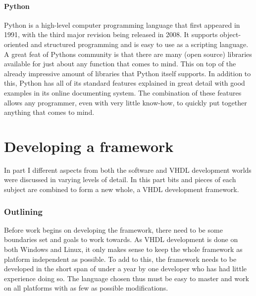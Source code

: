 \documentclass[11pt,british]{article}
\begin{document}
\subsection{Python}
Python is a high-level computer programming language that first appeared in 1991, with the third major revision being released in 2008. It supports object-oriented and structured programming and is easy to use as a scripting language. A great feat of Pythons community is that there are many (open source) libraries available for just about any function that comes to mind. This on top of the already impressive amount of libraries that Python itself supports. In addition to this, Python has all of its standard features explained in great detail with good examples in its online documenting system. The combination of these features allows any programmer, even with very little know-how, to quickly put together anything that comes to mind.


\newpage
\part{Developing a framework}
In part I different aspects from both the software and \gls{VHDL} development worlds were discussed in  varying levels of detail. In this part bits and pieces of each subject are combined to form a new whole, a VHDL development framework.

\section{Outlining}
\label{sec:outlining}
Before work begins on developing the framework, there need to be some boundaries set and goals to work towards. As VHDL development is done on both Windows and Linux, it only makes sense to keep the whole framework as platform independent as possible. To add to this, the framework needs to be developed in the short span of under a year by one developer who has had little experience doing so. The language chosen thus must be easy to master and work on all platforms with as few as possible modifications.
\end{document}
